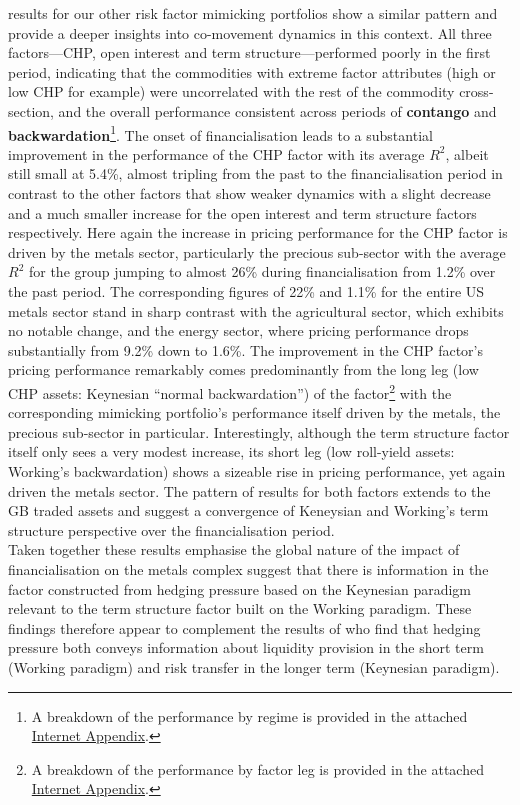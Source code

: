 \documentclass[
  authoryear,
  preprint,
  3p]{elsarticle}
\begin{document}
results for our other risk factor mimicking portfolios show a similar
pattern and provide a deeper insights into co-movement dynamics in this
context. All three factors---CHP, open interest and term
structure---performed poorly in the first period, indicating that the
commodities with extreme factor attributes (high or low CHP for example)
were uncorrelated with the rest of the commodity cross-section, and the
overall performance consistent across periods of \textbf{contango} and
\textbf{backwardation}\footnote{A breakdown of the performance by regime
  is provided in the attached
  \href{https://bautheac.shinyapps.io/co-movement/}{Internet Appendix}.}.
The onset of financialisation leads to a substantial improvement in the
performance of the CHP factor with its average \(R^{2}\), albeit still
small at 5.4\%, almost tripling from the past to the financialisation
period in contrast to the other factors that show weaker dynamics with a
slight decrease and a much smaller increase for the open interest and
term structure factors respectively. Here again the increase in pricing
performance for the CHP factor is driven by the metals sector,
particularly the precious sub-sector with the average \(R^{2}\) for the
group jumping to almost 26\% during financialisation from 1.2\% over the
past period. The corresponding figures of 22\% and 1.1\% for the entire
US metals sector stand in sharp contrast with the agricultural sector,
which exhibits no notable change, and the energy sector, where pricing
performance drops substantially from 9.2\% down to 1.6\%. The
improvement in the CHP factor's pricing performance remarkably comes
predominantly from the long leg (low CHP assets: Keynesian ``normal
backwardation'') of the factor\footnote{A breakdown of the performance
  by factor leg is provided in the attached
  \href{https://bautheac.shinyapps.io/co-movement/}{Internet Appendix}.}
with the corresponding mimicking portfolio's performance itself driven
by the metals, the precious sub-sector in particular. Interestingly,
although the term structure factor itself only sees a very modest
increase, its short leg (low roll-yield assets: Working's backwardation)
shows a sizeable rise in pricing performance, yet again driven the
metals sector. The pattern of results for both factors extends to the GB
traded assets and suggest a convergence of Keneysian and Working's term
structure perspective over the financialisation period.\\
Taken together these results emphasise the global nature of the impact
of financialisation on the metals complex suggest that there is
information in the factor constructed from hedging pressure based on the
Keynesian paradigm relevant to the term structure factor built on the
Working paradigm. These findings therefore appear to complement the
results of \citet{kang_tale_2020} who find that hedging pressure both
conveys information about liquidity provision in the short term (Working
paradigm) and risk transfer in the longer term (Keynesian paradigm).
\end{document}
